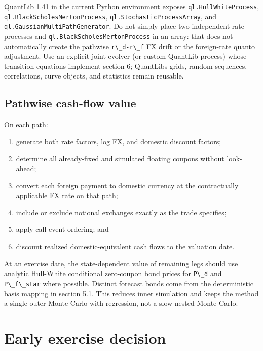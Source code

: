 \documentclass[conference]{IEEEtran}
\newcommand{\passthrough}[1]{#1}
\providecommand{\tightlist}{}
\begin{document}
QuantLib 1.41 in the current Python environment exposes
\passthrough{\lstinline!ql.HullWhiteProcess!},
\passthrough{\lstinline!ql.BlackScholesMertonProcess!},
\passthrough{\lstinline!ql.StochasticProcessArray!}, and
\passthrough{\lstinline!ql.GaussianMultiPathGenerator!}. Do not simply
place two independent rate processes and
\passthrough{\lstinline!ql.BlackScholesMertonProcess!} in an array: that
does not automatically create the pathwise
\passthrough{\lstinline!r\_d-r\_f!} FX drift or the foreign-rate quanto
adjustment. Use an explicit joint evolver (or custom QuantLib process)
whose transition equations implement section 6;
QuantLib\textquotesingle s grids, random sequences, correlations, curve
objects, and statistics remain reusable.

\subsection{Pathwise cash-flow
value}\label{73-pathwise-cash-flow-value}

On each path:

\begin{enumerate}
\def\labelenumi{\arabic{enumi}.}
\tightlist
\item
  generate both rate factors, log FX, and domestic discount factors;
\item
  determine all already-fixed and simulated floating coupons without
  look-ahead;
\item
  convert each foreign payment to domestic currency at the contractually
  applicable FX rate on that path;
\item
  include or exclude notional exchanges exactly as the trade specifies;
\item
  apply call event ordering; and
\item
  discount realized domestic-equivalent cash flows to the valuation
  date.
\end{enumerate}

At an exercise date, the state-dependent value of remaining legs should
use analytic Hull-White conditional zero-coupon bond prices for
\passthrough{\lstinline!P\_d!} and \passthrough{\lstinline!P\_f\_star!}
where possible. Distinct forecast bonds come from the deterministic
basis mapping in section 5.1. This reduces inner simulation and keeps
the method a single outer Monte Carlo with regression, not a slow nested
Monte Carlo.

\section{Early exercise decision}\label{8-early-exercise-decision}
\end{document}
